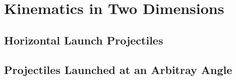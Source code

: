 \chapter{Kinematics in Two Dimensions}
	\section{Horizontal Launch Projectiles}
	\section{Projectiles Launched at an Arbitray Angle}


	


